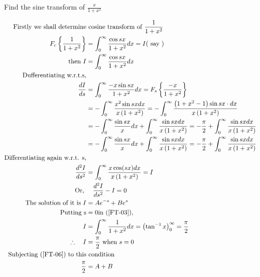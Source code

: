 \begin{exercise}
	Find the sine transform of $\frac{x}{1+x^{2}}$
\end{exercise}
\begin{answer}
	\begin{align}
	\text { Firstly we shall determine}&\text{ cosine transform of } \frac{1}{1+x^{2}}\notag\\
	F_{c}\left\{\frac{1}{1+x^{2}}\right\}&=\int_{0}^{\infty} \frac{\cos s x}{1+x^{2}} d x=I(\text { say })\notag\\
	\text{then }I&=\int_{0}^{\infty} \frac{\cos s x}{1+x^{2}} d x\label{FT-03}\\
	\text{Dufferentiating w.r.t.s,}\notag\\
	\frac{d I}{d s} &=\int_{0}^{\infty} \frac{-x \sin s x}{1+x^{2}} d x=F_{s}\left\{\frac{-x}{1+x^{2}}\right\}\label{FT-04} \\
	&=-\int_{0}^{\infty} \frac{x^{2} \sin s x d x}{x\left(1+x^{2}\right)}=-\int_{0}^{\infty} \frac{\left(1+x^{2}-1\right) \sin s x \cdot d x}{x\left(1+x^{2}\right)}\notag\\
	&=-\int_{0}^{\infty} \frac{\sin s x}{x} d x+\int_{0}^{\infty} \frac{\sin s x d x}{x\left(1+x^{2}\right)}=-\frac{\pi}{2}+\int_{0}^{\infty} \frac{\sin s x d x}{x\left(1+x^{2}\right)}\notag\\
	&=-\int_{0}^{\infty} \frac{\sin s x}{x} d x+\int_{0}^{\infty} \frac{\sin s x d x}{x\left(1+x^{2}\right)}=-\frac{\pi}{2}+\int_{0}^{\infty} \frac{\sin s x d x}{x\left(1+x^{2}\right)}\label{FT-05}\\
	\text{Differentiating again w.r.t. s,}\notag\\
	\frac{d^{2} I}{d s^{2}}&=\int_{0}^{\infty} \frac{x \cos (s x) d x}{x\left(1+x^{2}\right)}=I\notag\\
	\text { Or, } &\quad \frac{d^{2} I}{d s^{2}}-I=0\notag\\
	\text{The solution of it is }I&=A e^{-s}+B e^{s}\label{FT-06}\\
	\text{ Putting }\mathrm{s}&=0 \text{in (\ref{FT-03}),}\notag\\
	I &=\int_{0}^{\infty} \frac{1}{1+x^{2}} d x=\left(\tan ^{-1} x\right)_{0}^{\infty}=\frac{\pi}{2} \notag\\
	\therefore \quad I &=\frac{\pi}{2} \text { when } s=0\notag\\
	\text{Subjecting (\ref{FT-06}) to this}&\text{ condition}\notag\\
	\frac{\pi}{2}&=A+B\label{FT-07}
	\end{align}
\end{answer}
